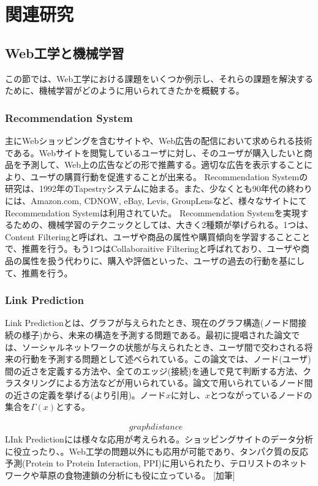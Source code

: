 \chapter{関連研究}
\section{Web工学と機械学習}
この節では、Web工学における課題をいくつか例示し、それらの課題を解決するために、機械学習がどのように用いられてきたかを概観する。
\subsection{Recommendation System}
主にWebショッピングを含むサイトや、Web広告の配信において求められる技術である。Webサイトを閲覧しているユーザに対し、そのユーザが購入したいと商品を予測して、Web上の広告などの形で推薦する。適切な広告を表示することにより、ユーザの購買行動を促進することが出来る。
Recommendation Systemの研究は、1992年のTapestryシステムに始まる\cite{goldberg1992using}。また、少なくとも90年代の終わりには、Amazon.com, CDNOW, eBay, Levis, GroupLensなど、様々なサイトにてRecommendation Systemは利用されていた\cite{resnick1997recommender}。
Recommendation Systemを実現するための、機械学習のテクニックとしては、大きく2種類が挙げられる\cite{koren2009matrix}。1つは、Content Filteringと呼ばれ、ユーザや商品の属性や購買傾向を学習することことで、推薦を行う。もう1つはCollaboraitive Filteringと呼ばれており、ユーザや商品の属性を扱う代わりに、購入や評価といった、ユーザの過去の行動を基にして、推薦を行う。
\subsection{Link Prediction}
Link Predictionとは、グラフが与えられたとき、現在のグラフ構造(ノード間接続の様子)から、未来の構造を予測する問題である。最初に提唱された論文\cite{liben2007link}では、ソーシャルネットワークの状態が与えられたとき、ユーザ間で交わされる将来の行動を予測する問題として述べられている。この論文では、ノード(ユーザ)間の近さを定義する方法や、全てのエッジ(接続)を通しで見て判断する方法、クラスタリングによる方法などが用いられている。論文で用いられているノード間の近さの定義を挙げる(\cite{liben2007link}より引用)。ノード$x$に対し、$x$とつながっているノードの集合を$Γ(x)$とする。\par
\begin{eqnarray}
graph distance & 
\end{eqnarray}
LInk Predictionには様々な応用が考えられる。ショッピングサイトのデータ分析に役立ったり\cite{clauset2004finding}、。Web工学の問題以外にも応用が可能であり、タンパク質の反応予測(Protein to Protein Interaction, PPI)に用いられたり\cite{bader2003gaining}、テロリストのネットワークや草原の食物連鎖の分析にも役に立っている\cite{clauset2008hierarchical}。
[加筆]
